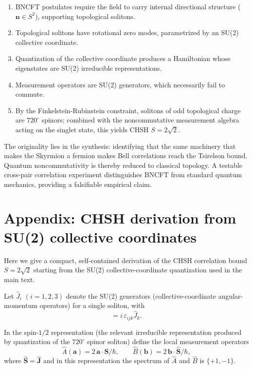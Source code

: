 ﻿\documentclass[11pt,a4paper]{article}
\begin{document}
\begin{enumerate}
\item BNCFT postulates require the field to carry internal directional structure ($\mathbf{n} \in S^2$), supporting topological solitons.
\item Topological solitons have rotational zero modes, parametrized by an SU(2) collective coordinate.
\item Quantization of the collective coordinate produces a Hamiltonian whose eigenstates are SU(2) irreducible representations.
\item Measurement operators are SU(2) generators, which necessarily fail to commute.
\item By the Finkelstein-Rubinstein constraint, solitons of odd topological charge are $720^\circ$ spinors; combined with the noncommutative measurement algebra acting on the singlet state, this yields CHSH $S = 2\sqrt{2}$.
\end{enumerate}

The originality lies in the synthesis: identifying that the same machinery that makes the Skyrmion a fermion makes Bell correlations reach the Tsirelson bound. Quantum noncommutativity is thereby reduced to classical topology. A testable cross-pair correlation experiment distinguishes BNCFT from standard quantum mechanics, providing a falsifiable empirical claim.

\section*{Appendix: CHSH derivation from SU(2) collective coordinates}

Here we give a compact, self-contained derivation of the CHSH correlation bound $S=2\sqrt{2}$ starting from the SU(2) collective-coordinate quantization used in the main text.

Let $\hat{J}_i$ $(i=1,2,3)$ denote the SU(2) generators (collective-coordinate angular-momentum operators) for a single soliton, with
\begin{equation}
[\hat{J}_i,\hat{J}_j]= i\,\varepsilon_{ijk}\hat{J}_k.
\end{equation}

In the spin-$1/2$ representation (the relevant irreducible representation produced by quantization of the $720^\circ$ spinor soliton) define the local measurement operators
\begin{equation}
\hat{A}(\mathbf{a})=2\,\mathbf{a}\cdot\hat{\mathbf{S}}/\hbar,\qquad \hat{B}(\mathbf{b})=2\,\mathbf{b}\cdot\hat{\mathbf{S}}/\hbar,
\end{equation}
where $\hat{\mathbf{S}}=\hat{\mathbf{J}}$ and in this representation the spectrum of $\hat{A}$ and $\hat{B}$ is $\{+1,-1\}$.
\end{document}
